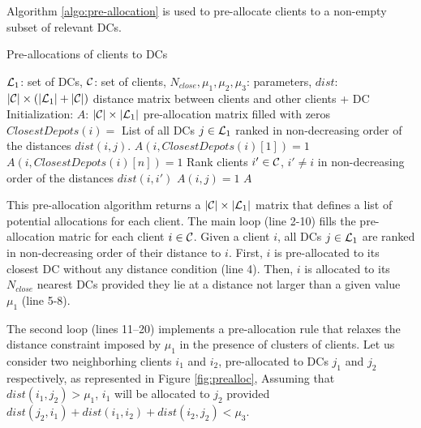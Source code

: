 \documentclass[a4paper,10pt]{article}
\begin{document}
\begin{linenumbers}
Algorithm \ref{algo:pre-allocation} is used to pre-allocate clients to a non-empty subset of relevant DCs. 
%
\begin{algorithm}
	\caption{Pre-allocations of clients to DCs}
	\label{algo:pre-allocation}
	\begin{algorithmic}[1]
		\REQUIRE  $\loc_1$: set of DCs, $\cu$: set of clients, $N_{close}, \mu_1, \mu_2, \mu_3$: parameters, 
		$dist$: $|\cu|\times (|\loc_1|+|\cu|)$ distance matrix between clients and other clients + DC
		\STATE Initialization: $A$: $|\cu| \times |\loc_1|$ pre-allocation matrix filled with zeros
		\STATE $ClosestDepots(i) = $ List of all DCs $j \in \loc_1$ ranked in non-decreasing order of the distances $dist(i,j)$.
		\STATE 	$A(i,ClosestDepots(i)[1]) =1$ 	
		\STATE 	$A(i,ClosestDepots(i)[n]) =1$ 			
		\ENDIF
		\ENDFOR
		\ENDFOR
		\STATE Rank clients $i' \in \cu$, $i' \neq i$ in non-decreasing order of the distances $dist(i,i')$ 
		\STATE $A(i,j) =1$
		\ENDIF
		\ENDFOR
		\ENDFOR
		\ENDFOR
		\RETURN $A$
	\end{algorithmic}
\end{algorithm}
%
This pre-allocation algorithm returns a $|\cu| \times |\loc_1|$ matrix that defines a list of potential allocations for each client. 
The main loop (line 2-10) fills the pre-allocation matric for each client $i \in \cu$. 
Given a client $i$, all DCs $j \in \loc_1$ are ranked in non-decreasing order of their distance to $i$. 
First, $i$ is pre-allocated to its closest DC without any distance condition (line 4). 
Then, $i$ is allocated to its $N_{close}$ nearest DCs provided they lie at a distance not larger than a given value $\mu_1$ (line 5-8).

The second loop (lines 11--20) implements a pre-allocation rule that relaxes the distance constraint imposed by $\mu_1$ 
in the presence of clusters of clients. 
Let us consider two neighborhing clients $i_1$ and $i_2$, pre-allocated to DCs $j_1$ and $j_2$ respectively,
 as represented in Figure \ref{fig:prealloc}, 
Assuming that $dist(i_1,j_2) > \mu_1$, $i_1$ will be allocated to $j_2$ provided 
$dist(j_2,i_1) + dist(i_1,i_2) + dist(i_2,j_2) < \mu_3$. 

 
 \begin{figure}[htbp]
 	\centering
 	\begin{tikzpicture}[scale=0.8, auto,swap]
 	

\end{tikzpicture}
\end{figure}
\end{linenumbers}
\end{document}
